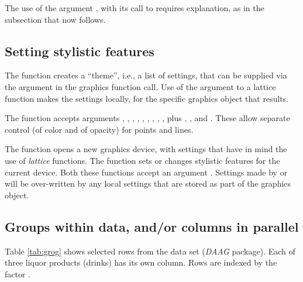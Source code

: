 The use of the argument , with its call to
 requires explanation, as in the subsection
that now follows.

\subsection{Setting stylistic features}\label{ss:style}

The function  creates a ``theme'', i.e., a list of
settings, that can be supplied via the argument  in
the graphics function call.  Use of the argument 
to a lattice function makes the settings locally, for the specific
graphics object that results.

The 
function  accepts arguments ,
, , , , ,
, , , plus ,
,  and .  These
allow separate control (of color and of opacity) for points and lines.

The function  opens a new graphics device, with
settings that have in mind the use of {\em lattice} functions. The
function  sets or changes stylistic features
for the current device. Both these functions accept an argument
.  Settings made by
 or  will be
over-written by any local settings that are stored as part of the
graphics object.

\subsection{Groups within data, and/or columns in parallel}\label{ss:grog}

Table \ref{tab:grog} shows selected rows from the data set 
(\textit{DAAG} package). Each of three liquor products (drinks) has
its own column. Rows are indexed by the factor .

